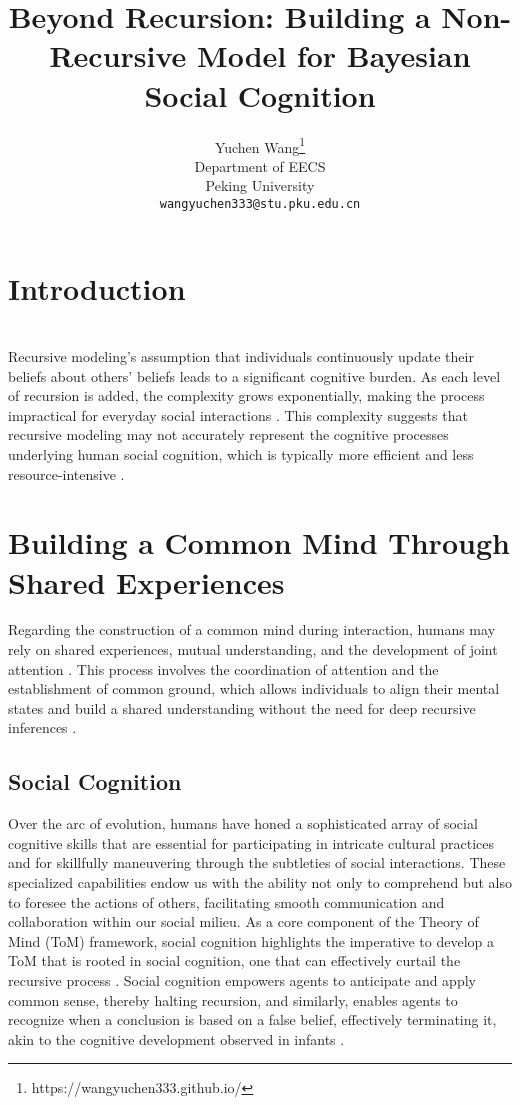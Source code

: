 \documentclass{article}
\title{Beyond Recursion: Building a Non-Recursive Model for Bayesian Social Cognition}
\author{%
  Yuchen Wang\thanks{https://wangyuchen333.github.io/} \\
  Department of EECS\\
  Peking University\\
  \texttt{wangyuchen333@stu.pku.edu.cn} \\
}
\begin{document}
\maketitle

\begin{abstract}

\end{abstract}


\section{Introduction}


\section{}
Recursive modeling's assumption that individuals continuously update their beliefs about others' beliefs leads to a significant cognitive burden. As each level of recursion is added, the complexity grows exponentially, making the process impractical for everyday social interactions \citep{doshi2020recursively}. This complexity suggests that recursive modeling may not accurately represent the cognitive processes underlying human social cognition, which is typically more efficient and less resource-intensive \citep{royzman2003know}.

\section{Building a Common Mind Through Shared Experiences}
Regarding the construction of a common mind during interaction, humans may rely on shared experiences, mutual understanding, and the development of joint attention \citep{Tomasello2018}. This process involves the coordination of attention and the establishment of common ground, which allows individuals to align their mental states and build a shared understanding without the need for deep recursive inferences \citep{Sebanz2003}.

\subsection{Social Cognition}

Over the arc of evolution, humans have honed a sophisticated array of social cognitive skills that are essential for participating in intricate cultural practices and for skillfully maneuvering through the subtleties of social interactions. These specialized capabilities endow us with the ability not only to comprehend but also to foresee the actions of others, facilitating smooth communication and collaboration within our social milieu. As a core component of the Theory of Mind (ToM) framework, social cognition highlights the imperative to develop a ToM that is rooted in social cognition, one that can effectively curtail the recursive process \citep{herrmann2007humans}. Social cognition empowers agents to anticipate and apply common sense, thereby halting recursion, and similarly, enables agents to recognize when a conclusion is based on a false belief, effectively terminating it, akin to the cognitive development observed in infants \citep{houde2022cambridge}.
\end{document}

